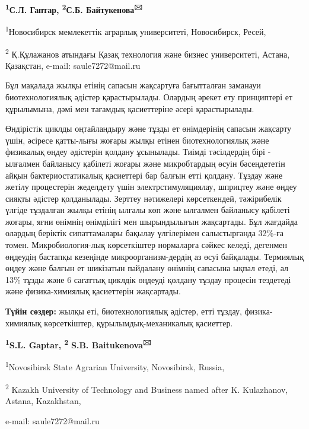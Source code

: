 \begin{center}

{\bfseries \textsuperscript{1}С.Л. Гаптар, \textsuperscript{2}С.Б.
Байтукенова\textsuperscript{🖂}}

\textsuperscript{1}Новосибирск мемлекеттік аграрлық университеті,
Новосибирск, Ресей,

\textsuperscript{2} Қ.Құлажанов атындағы Қазақ технология және бизнес
университеті, Астана, Қазақстан, e-mail: saule7272@mail.ru
\end{center}

Бұл мақалада жылқы етінің сапасын жақсартуға бағытталған заманауи
биотехнологиялық әдістер қарастырылады. Олардың әрекет ету принциптері
ет құрылымына, дәмі мен тағамдық қасиеттеріне әсері қарастырылады.

Өндірістік циклды оңтайландыру және тұзды ет өнімдерінің сапасын
жақсарту үшін, әсіресе қатты-лығы жоғары жылқы етінен биотехнологиялық
және физикалық өңдеу әдістерін қолдану ұсынылады. Тиімді тәсілдердің
бірі - ылғалмен байланысу қабілеті жоғары және микробтардың өсуін
бәсеңдететін айқын бактериостатикалық қасиеттері бар балғын етті
қолдану. Тұздау және жетілу процестерін жеделдету үшін
электрстимуляциялау, шприцтеу және өңдеу сияқты әдістер қолданылады.
Зерттеу нәтижелері көрсеткендей, тәжірибелік үлгіде тұздалған жылқы
етінің ылғалы көп және ылғалмен байланысу қабілеті жоғары, яғни өнімнің
өнімділігі мен шырындылығын жақсартады. Бұл жағдайда олардың беріктік
сипаттамалары бақылау үлгілерімен салыстырғанда 32\%-ға төмен.
Микробиология-лық көрсеткіштер нормаларға сәйкес келеді, дегенмен
өңдеудің бастапқы кезеңінде микроорганизм-дердің аз өсуі байқалады.
Термиялық өңдеу және балғын ет шикізатын пайдалану өнімнің сапасына
ықпал етеді, ал 13\% тұзды және 6 сағаттық циклдік өңдеуді қолдану
тұздау процесін тездетеді және физика-химиялық қасиеттерін жақсартады.

{\bfseries Түйін сөздер:} жылқы еті, биотехнологиялық әдістер, етті тұздау,
физика-химиялық көрсеткіштер, құрылымдық-механикалық қасиеттер.

\begin{center}

{\bfseries \textsuperscript{1}S.L. Gaptar, \textsuperscript{2}}
{\bfseries S.B. Baitukenova\textsuperscript{🖂}}

\textsuperscript{1}Novosibirsk State Agrarian University, Novosibirsk,
Russia,

\textsuperscript{2} Kazakh University of Technology and Business named
after K. Kulazhanov, Astana, Kazakhstan,

e-mail: saule7272@mail.ru
\end{center}

